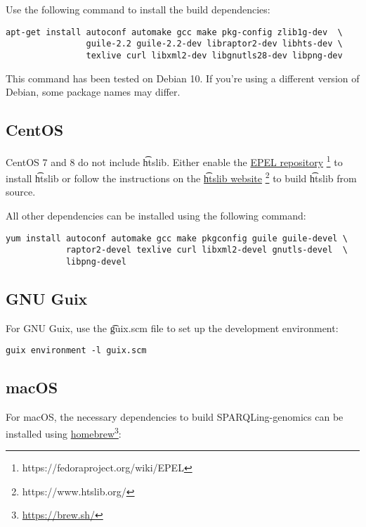   Use the following command to install the build dependencies:

\begin{lstlisting}
apt-get install autoconf automake gcc make pkg-config zlib1g-dev  \
                guile-2.2 guile-2.2-dev libraptor2-dev libhts-dev \
                texlive curl libxml2-dev libgnutls28-dev libpng-dev
\end{lstlisting}

  This command has been tested on Debian 10.  If you're using a different
  version of Debian, some package names may differ.

\subsection{CentOS}

  CentOS 7 and 8 do not include \t{htslib}.  Either enable the
  \href{https://fedoraproject.org/wiki/EPEL}{EPEL repository}%
  \footnote{https://fedoraproject.org/wiki/EPEL}
  to install \t{htslib} or follow the instructions on the
  \href{https://www.htslib.org/}{\t{htslib} website}%
  \footnote{https://www.htslib.org/} to build \t{htslib} from source.

  All other dependencies can be installed using the following command:

\begin{lstlisting}
yum install autoconf automake gcc make pkgconfig guile guile-devel \
            raptor2-devel texlive curl libxml2-devel gnutls-devel  \
            libpng-devel
\end{lstlisting}

\subsection{GNU Guix}

  For GNU Guix, use the \t{guix.scm} file to set up the development
  environment:

\begin{lstlisting}
guix environment -l guix.scm
\end{lstlisting}

\subsection{macOS}

  For macOS, the necessary dependencies to build SPARQLing-genomics
  can be installed using
  \href{https://brew.sh/}{homebrew}\footnote{\url{https://brew.sh/}}:

